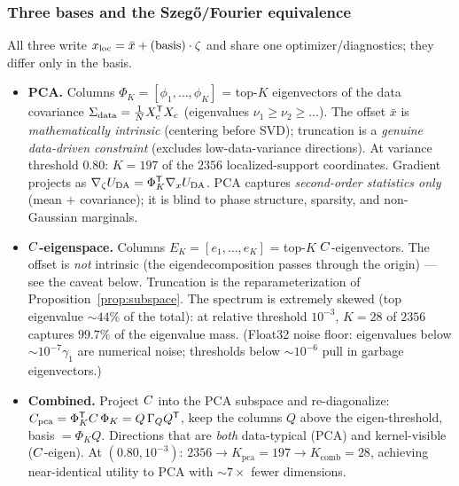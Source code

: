 \subsubsection{Three bases and the Szeg\H{o}/Fourier equivalence}
All three write $x_{\mathrm{loc}}=\bar{x}+\text{(basis)}\cdot\zeta$ and share one
optimizer/diagnostics; they differ only in the basis.
\begin{itemize}[leftmargin=1.4em]
  \item \textbf{PCA.} Columns $\Phi_K=[\phi_1,\dots,\phi_K]$ = top-$K$ eigenvectors
        of the data covariance $\Sigma_{\mathrm{data}}=\tfrac1N X_c^{\mathsf{T}} X_c$
        (eigenvalues $\nu_1\ge\nu_2\ge\dots$). The offset $\bar{x}$ is
        \emph{mathematically intrinsic} (centering before SVD); truncation is a
        \emph{genuine data-driven constraint} (excludes low-data-variance
        directions). At variance threshold $0.80$: $K=197$ of the $2356$
        localized-support coordinates. Gradient projects as
        $\nabla_\zeta U_{\mathrm{DA}}=\Phi_K^{\mathsf{T}}\nabla_xU_{\mathrm{DA}}$.
        PCA captures \emph{second-order statistics only} (mean $+$ covariance);
        it is blind to phase structure, sparsity, and non-Gaussian marginals.
  \item \textbf{$C$-eigenspace.} Columns $E_K=[e_1,\dots,e_K]$ = top-$K$
        $C$-eigenvectors. The offset is \emph{not} intrinsic (the
        eigendecomposition passes through the origin) --- see the caveat below.
        Truncation is the reparameterization of Proposition~\ref{prop:subspace}.
        The spectrum is extremely skewed (top eigenvalue $\sim44\%$ of the total):
        at relative threshold $10^{-3}$, $K=28$ of $2356$ captures $99.7\%$ of the
        eigenvalue mass. (Float32 noise floor: eigenvalues below $\sim10^{-7}\gamma_1$
        are numerical noise; thresholds below $\sim10^{-6}$ pull in garbage
        eigenvectors.)
  \item \textbf{Combined.} Project $C$ into the PCA subspace and re-diagonalize:
        $C_{\mathrm{pca}}=\Phi_K^{\mathsf{T}}C\,\Phi_K=Q\,\Gamma_Q Q^{\mathsf{T}}$,
        keep the columns $Q$ above the eigen-threshold, basis $=\Phi_K Q$.
        Directions that are \emph{both} data-typical (PCA) and kernel-visible
        ($C$-eigen). At $(0.80,10^{-3})$: $2356\to K_{\mathrm{pca}}=197\to
        K_{\mathrm{comb}}=28$, achieving near-identical utility to PCA with
        $\sim7\times$ fewer dimensions.
\end{itemize}

